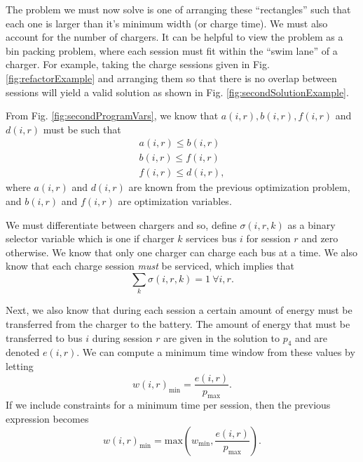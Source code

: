 \par The problem we must now solve is one of arranging these ``rectangles'' such that each one is larger than it's minimum width (or charge time).  We must also account for the number of chargers. It can be helpful to view the problem as a bin packing problem, where each session must fit within the ``swim lane'' of a charger.  For example, taking the charge sessions given in Fig. \ref{fig:refactorExample} and arranging them so that there is no overlap between sessions will yield a valid solution as shown in Fig. \ref{fig:secondSolutionExample}.
\par From Fig. \ref{fig:secondProgramVars}, we know that $a(i,r), b(i,r),f(i,r)$ and $d(i,r)$ must be such that 
\begin{equation}\label{eqn:assignment:eqn1}\begin{aligned}
	a(i,r) \le b(i,r) \\
	b(i,r) \le f(i,r) \\
	f(i,r) \le d(i,r), 	
\end{aligned}\end{equation}
where $a(i,r)$ and $d(i,r)$ are known from the previous optimization problem, and $b(i,r)$ and $f(i,r)$ are optimization variables. 
\par We must differentiate between chargers and so, define $\sigma(i,r,k)$ as a binary selector variable which is one if charger $k$ services bus $i$ for session $r$ and zero otherwise. We know that only one charger can charge each bus at a time. We also know that each charge session {\it must} be serviced, which implies that
\begin{equation}\label{eqn:assignment:eqn2}
	\sum_k \sigma(i,r,k) = 1  \ \forall i,r.
\end{equation}
\par Next, we also know that during each session a certain amount of energy must be transferred from the charger to the battery.  The amount of energy that must be transferred to bus $i$ during session $r$ are given in the solution to $p_4$ and are denoted $e(i,r)$. We can compute a minimum time window from these values by letting 
\begin{equation}\label{eqn:assignment:eqn3}
	w(i,r)_{\text{min}} = \frac{e(i,r)}{p_\text{max}}.
\end{equation}
If we include constraints for a minimum time per session, then the previous expression becomes
\begin{equation*}
	w(i,r)_{\text{min}} = \text{max}\left ( w_{\text{min}}, \frac{e(i,r)}{p_\text{max}} \right ).
\end{equation*}
